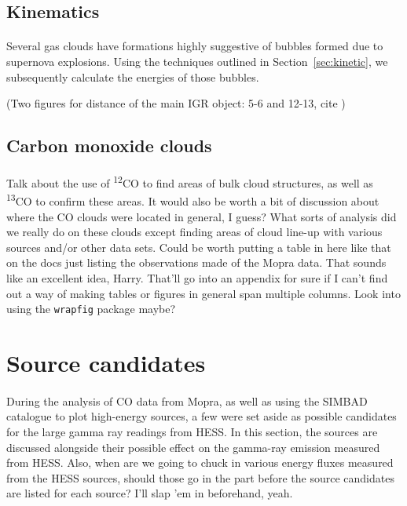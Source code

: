 \documentclass[a4paper, titlepage, oneside]{article}
\newcommand{\elem}[2]{\textsuperscript{#1}{#2}}
\begin{document}
\begin{multicols}{2}
\subsection{Kinematics}
\paragraph{}
Several gas clouds have formations highly suggestive of bubbles formed due to supernova explosions. Using the techniques outlined in Section~\ref{sec:kinetic}, we subsequently calculate the energies of those bubbles.

(Two figures for distance of the main IGR object: 5-6 and 12-13, cite \parencite{Lutovinov:2005})

\subsection{Carbon monoxide clouds}
\paragraph{}
Talk about the use of \elem{12}{C}O to find areas of bulk cloud structures, as well as \elem{13}{C}O to confirm these areas. It would also be worth a bit of discussion about where the CO clouds were located in general, I guess? What sorts of analysis did we really do on these clouds except finding areas of cloud line-up with various sources and/or other data sets. Could be worth putting a table in here like that on the docs just listing the observations made of the Mopra data. That sounds like an excellent idea, Harry. That'll go into an appendix for sure if I can't find out a way of making tables or figures in general span multiple columns. Look into using the \texttt{wrapfig} package maybe?

\section{Source candidates}
\paragraph{}
During the analysis of CO data from Mopra, as well as using the SIMBAD catalogue to plot high-energy sources, a few were set aside as possible candidates for the large gamma ray readings from HESS. In this section, the sources are discussed alongside their possible effect on the gamma-ray emission measured from HESS. Also, when are we going to chuck in various energy fluxes measured from the HESS sources, should those go in the part before the source candidates are listed for each source? I'll slap 'em in beforehand, yeah.


\end{multicols}
\end{document}
